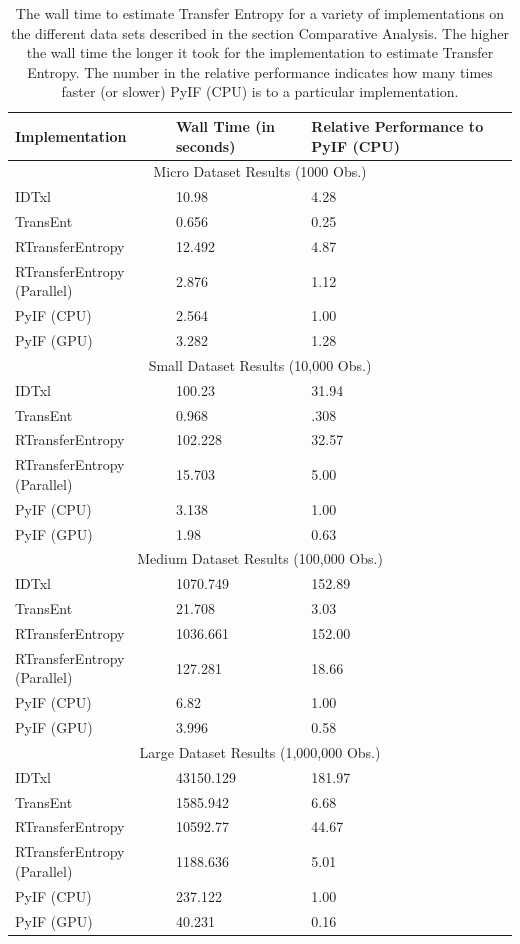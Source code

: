 \documentclass[conference]{IEEEtran}
\begin{document}
\begin{table}[htbp]
		\caption{The wall time to estimate Transfer Entropy for a variety of implementations on the different data sets described in the section Comparative Analysis.  The higher the wall time the longer it took for the implementation to estimate Transfer Entropy. The number in the relative performance indicates how many times faster (or slower) PyIF (CPU) is to a particular implementation. }
	\begin{center}
		\begin{tabular}{ |p{4cm}|p{1cm}| p{2cm}|  }
			\hline
			Implementation & Wall Time (in seconds) &  Relative Performance to PyIF (CPU)\\
 			\hline
			 \multicolumn{3}{|c|}{Micro Dataset Results (1000 Obs.)} \\
 			\hline
			IDTxl   & 10.98 & 4.28\\
 			TransEnt   & 0.656 & 0.25\\
	 		RTransferEntropy   & 12.492 & 4.87\\
	 		RTransferEntropy (Parallel) & 2.876 & 1.12\\
 			PyIF (CPU)   & 2.564 & 1.00\\
 			PyIF (GPU) & 3.282  & 1.28\\
 			 \hline
 			\multicolumn{3}{|c|}{Small Dataset Results (10,000 Obs.)} \\
 			\hline
		 	IDTxl   & 100.23 & 31.94\\
		 	TransEnt   & 0.968 & .308\\
 			RTransferEntropy   & 102.228 & 32.57\\
 			RTransferEntropy (Parallel) & 15.703 & 5.00\\
 			PyIF (CPU)   & 3.138 & 1.00\\
			 PyIF (GPU) & 1.98 & 0.63\\
 			 \hline
 			\multicolumn{3}{|c|}{Medium Dataset Results (100,000 Obs.)} \\
 			\hline
		 	IDTxl   & 1070.749 & 152.89\\
		 	TransEnt   & 21.708 & 3.03\\
 			RTransferEntropy   & 1036.661 & 152.00\\
 			RTransferEntropy (Parallel) & 127.281 & 18.66\\
 			PyIF (CPU)   & 6.82 & 1.00\\
			PyIF (GPU) & 3.996 & 0.58\\
 			 \hline
 			\multicolumn{3}{|c|}{Large Dataset Results (1,000,000 Obs.)} \\
 			\hline
		 	IDTxl   &  43150.129 & 181.97\\
		 	TransEnt   & 1585.942 & 6.68\\
 			RTransferEntropy   & 10592.77 & 44.67\\
 			RTransferEntropy (Parallel) & 1188.636 & 5.01\\
 			PyIF (CPU)   & 237.122 & 1.00\\
			 PyIF (GPU) & 40.231 & 0.16\\
			 \hline


\end{tabular}
\end{center}
\end{table}
\end{document}
